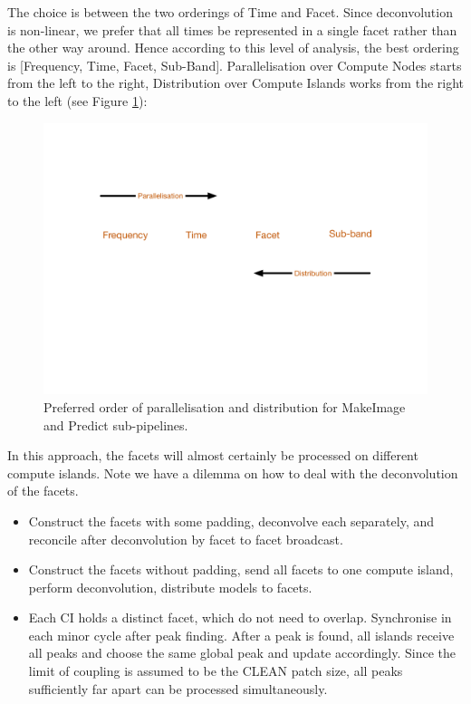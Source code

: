 \documentclass[11pt,a4paper,variablewidth]{article}
\begin{document}
The choice is between the two orderings of Time and Facet. Since deconvolution is non-linear, we prefer that all times be represented in a single facet rather than the other way around. Hence according to this level of analysis, the best ordering is [Frequency, Time, Facet, Sub-Band]. Parallelisation over Compute Nodes starts from the left to the right, Distribution over Compute Islands works from the right to the left (see Figure \ref{fig:order}):

\begin{figure}[htb]
  \centering
  \includegraphics[width=\textwidth]{./Order.pdf}
  \caption{Preferred order of parallelisation and distribution for MakeImage and Predict sub-pipelines.}
  \label{fig:order}
\end{figure}

In this approach, the facets will almost certainly be processed on different compute islands. Note we have a dilemma on how to deal with the deconvolution of the facets.

\begin{itemize}	
\item Construct the facets with some padding, deconvolve each separately, and reconcile after deconvolution by facet to facet broadcast.
\item Construct the facets without padding, send all facets to one compute island, perform deconvolution, distribute models to facets. 
\item Each CI holds a distinct facet, which do not need to overlap. Synchronise in each minor cycle after peak finding. After a peak is found, all islands receive all peaks and choose the same global peak and update accordingly. Since the limit of coupling is assumed to be the CLEAN patch size, all peaks sufficiently far apart can be processed simultaneously.
\end{itemize}
\end{document}
